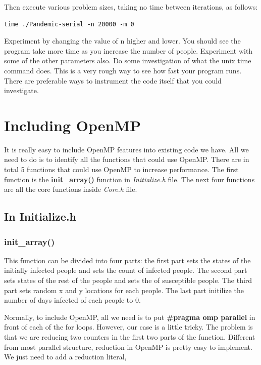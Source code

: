 \documentclass[letterpaper,10pt,openany,oneside]{sphinxmanual}
\begin{document}
Then execute various problem sizes, taking no time between iterations, as follows:

\begin{Verbatim}[commandchars=\\\{\}]
time ./Pandemic-serial -n 20000 -m 0
\end{Verbatim}

Experiment by changing the value of n higher and lower.  You should see the program take more time as you increase the number of people.  Experiment with some of the other parameters also. Do some investigation of what the unix time command does.  This is a very rough way to see how fast your program runs.  There are preferable ways to instrument the code itself that you could investigate.


\chapter{Including OpenMP}
\label{8-OpenMP/openmp:including-openmp}\label{8-OpenMP/openmp::doc}

It is really easy to include OpenMP features into existing code we have. All we need to do is to identify all the functions that could use OpenMP. There are in total 5 functions that could use OpenMP to increase performance. The first function is the \textbf{init\_array()} function in \emph{Initialize.h} file. The next four functions are all the core functions inside \emph{Core.h} file.


\section{In Initialize.h}
\label{8-OpenMP/openmp:in-initialize-h}

\subsection{init\_array()}
\label{8-OpenMP/openmp:init-array}
This function can be divided into four parts: the first part sets the states of the initially infected people and sets the count of infected people. The second part sets states of the rest of the people and sets the of susceptible people. The third part sets random x and y locations for each people. The last part initilize the number of days infected of each people to 0.

Normally, to include OpenMP, all we need is to put \textbf{\#pragma omp parallel} in front of each of the for loops. However, our case is a little tricky. The problem is that we are reducing two counters in the first two parts of the function. Different from most parallel structure, reduction in OpenMP is pretty easy to implement. We just need to add a reduction literal,
\end{document}
